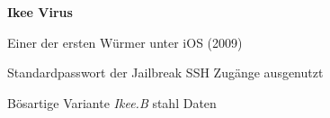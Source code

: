 \begin{frame}
	\centering
	\textbf{Ikee Virus}
	\begin{block}{}
		Einer der ersten Würmer unter iOS (2009)
	\end{block}
	\begin{block}{}
		Standardpasswort der Jailbreak SSH Zugänge ausgenutzt
	\end{block}
	\begin{block}{}
		Bösartige Variante \textsl{Ikee.B} stahl Daten
	\end{block}
\end{frame}